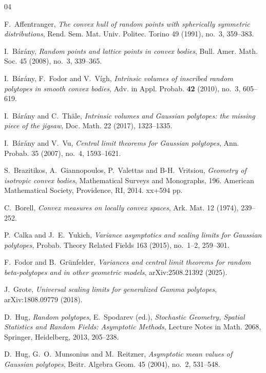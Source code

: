 \documentclass[10pt]{amsart}
\newcommand{\1}{\textbf{1}}
\numberwithin{equation}{section} %
\theoremstyle{remark}
\theoremstyle{definition}
\begin{document}
\begin{thebibliography}{04}


\textrm{F.\ Affentranger},
\textit{The convex hull of random points with spherically symmetric distributions},
Rend. Sem. Mat. Univ. Politec. Torino {49} (1991), no.~3, 359--383.

\textrm{I.\ B\'ar\'any},
\textit{Random points and lattice points in convex bodies},
Bull. Amer. Math. Soc. {45} (2008), no.~3, 339--365.

\textrm{I.\ B\'ar\'any, F.\ Fodor and V.\ V\'igh},
\textit{Intrinsic volumes of inscribed random polytopes in smooth convex bodies},
Adv. in Appl. Probab. \textbf{42} (2010), no.~3, 605--619.

 \textrm{I.\ B\'ar\'any and C.\ Th\"ale},
\textit{Intrinsic volumes and Gaussian polytopes: the missing piece of the jigsaw},
Doc. Math. {22} (2017), 1323--1335.

 \textrm{I.\ B\'ar\'any and V.\ Vu},
\textit{Central limit theorems for Gaussian polytopes},
Ann. Probab. {35} (2007), no.~4, 1593--1621.

 \textrm{S.\ Brazitikos, A.\ Giannopoulos, P.\ Valettas and B-H.\ Vritsiou}, \textit{Geometry of isotropic
convex bodies}, Mathematical Surveys and Monographs, 196. American Mathematical Society, Providence, RI, 2014. xx+594 pp.

 \textrm{C.\ Borell}, \textit{Convex measures on locally convex spaces}, Ark. Mat. {12} (1974), 239--252.

\textrm{P.\ Calka and J.\ E.\ Yukich},
\textit{Variance asymptotics and scaling limits for Gaussian polytopes},
Probab. Theory Related Fields {163} (2015), no.~1--2, 259--301.


\textrm{F.\ Fodor and B.\ Gr\"unfelder},
\textit{Variances and central limit theorems for random beta-polytopes
and in other geometric models},
arXiv:2508.21392 (2025).

\textrm{J.\ Grote},
\textit{Universal scaling limits for generalized Gamma polytopes},
arXiv:1808.09779 (2018).

\textrm{D.\ Hug},
\textit{Random polytopes},
E.\ Spodarev (ed.), \textit{Stochastic Geometry, Spatial Statistics and Random Fields: Asymptotic Methods},
Lecture Notes in Math. {2068}, Springer, Heidelberg, 2013, 205--238.


\textrm{D.\ Hug, G.\ O.\ Munsonius and M.\ Reitzner},
\textit{Asymptotic mean values of Gaussian polytopes},
Beitr. Algebra Geom. {45} (2004), no.~2, 531--548.



\end{thebibliography}
\end{document}
